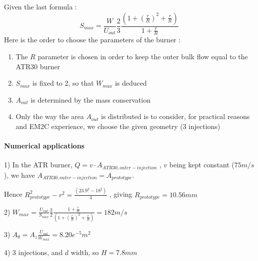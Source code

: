 Given the last formula :
\begin{equation}
S_{max}=\frac{W}{U_{out}}\frac{2}{3}\frac{(1+(\frac{r}{R})^2+\frac{r}{R})}{1+\frac{r}{R}}
\end{equation}
Here is the order to choose the parameters of the burner :
\begin{enumerate}
\item The $R$ parameter is chosen in order to keep the outer bulk flow equal to the ATR30 burner
\item $S_{max}$ is fixed to 2, so that $W_{max}$ is deduced
\item $A_{out}$ is determined by the mass conservation
\item Only the way the area $A_{out}$ is distributed is to consider, for practical reasons and EM2C experience, we choose the given geometry (3 injections)
\end{enumerate}

\paragraph{Numerical applications}
1) In the ATR burner, $Q=v \cdot A_{ATR30, outer-injection}$  , $v$ being kept constant ($75m/s$), we have $A_{ATR30, outer-injection}=A_{prototype}$. 

Hence $R_{prototype}^2-r^2=\frac{(23.9^2-18^2)}{4}$ , giving $R_{prototype}=10.56mm$

2) $W_{max}=\frac{U_{out}}{S_{max}} \frac{3}{2}\frac{1+\frac{r}{R}}{(1+(\frac{r}{R})^2+\frac{r}{R})}=182m/s$ 

3) $A_{\theta}= A_{z} \frac{U_{out}}{W_{max}}=8.20e^{-5} m^2$ 

4) 3 injections, and $d$ width, so $H=7.8mm$ 


